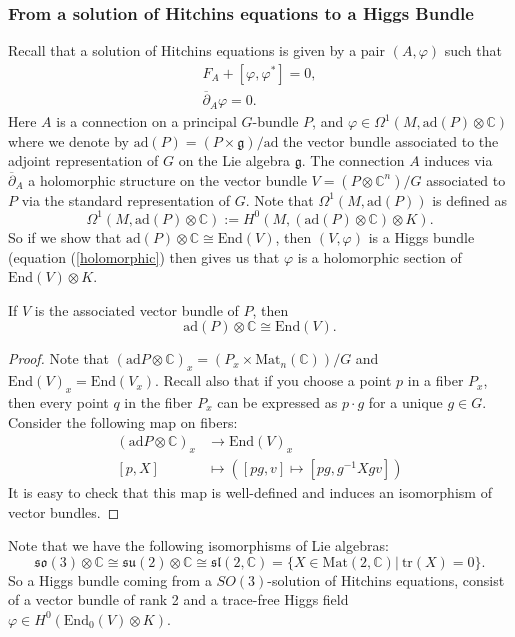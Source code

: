 \subsubsection*{From a solution of Hitchins equations to a Higgs Bundle}
Recall that a solution of Hitchins equations is given by a pair $(A,\varphi)$ such that 
\begin{align}
	F_A + [\varphi,\varphi^*] = 0, \\
	\overline{\partial}_A\varphi = 0. \label{holomorphic}
\end{align}
Here $A$ is a connection on a principal $G$-bundle $P$, and $\varphi \in \Omega^1 ( M , \mathrm{ad} ( P) \otimes \mathbb{C} )$ where we denote by $\mathrm{ad} ( P) = (P \times \mathfrak{g})/\mathrm{ad}$ the vector bundle associated to the adjoint representation of $G$ on the Lie algebra $\mathfrak{g}$. The connection $A$ induces via $\overline{\partial}_A$ a holomorphic structure on the vector bundle $V = (P \otimes \mathbb{C} ^n) / G$ associated to $P$ via the standard representation of $G$. Note that $\Omega^1 ( M , \mathrm{ad} ( P))$ is defined as 
\[
\Omega^1 ( M , \mathrm{ad} ( P)\otimes \mathbb{C}) := H^0 ( M , ( \mathrm{ad} (P) \otimes \mathbb{C} ) \otimes K). 
\]
So if we show that $\mathrm{ad} ( P) \otimes \mathbb{C} \cong \mathrm{End}(V)$, then $(V,\varphi)$ is a Higgs bundle (equation (\ref{holomorphic}) then gives us that $\varphi$ is a holomorphic section of $\mathrm{End}(V)\otimes K$.

\begin{lemma}
	If $V$ is the associated vector bundle of $P$, then
	\[
	\mathrm{ad} ( P) \otimes \mathbb{C} \cong \mathrm{End}(V).
	\]
\end{lemma}
\begin{proof} Note that $(\mathrm{ad}P \otimes \mathbb{C} )_x = (P_x \times \mathrm{Mat}_n(\mathbb{C}))/G$ and $\mathrm{End}(V)_x = \mathrm{End}(V_x)$. Recall also that if you choose a point $p$ in a fiber $P_x$, then every point $q$ in the fiber $P_x$ can be expressed as $p\cdot g$ for a unique $g \in G$. Consider the following map on fibers: 
	\begin{align*}
	(\mathrm{ad}P \otimes \mathbb{C} )_x & \rightarrow  \mathrm{End}(V) _x \\
	[p, X ] & \mapsto ([pg, v] \mapsto [pg, g^{-1} X g v] ) 
	\end{align*}
It is easy to check that this map is well-defined and induces an isomorphism of vector bundles. 
\end{proof}

\begin{remark}\label{G=SU(2)}
	Note that we have the following isomorphisms of Lie algebras:
	\begin{equation}
	\mathfrak{so}(3) \otimes \mathbb{C} \cong \mathfrak{su}(2) \otimes \mathbb{C}  \cong \mathfrak{sl}(2, \mathbb{C} ) = \{ X \in \mathrm{Mat}(2, \mathbb{C} )| ~ \mathrm{tr}(X) = 0 \}.
	\end{equation}
	So a Higgs bundle coming from a $SO(3)$-solution of Hitchins equations, consist of a vector bundle of rank 2 and a trace-free Higgs field $\varphi \in H^0(\mathrm{End}_0(V)\otimes K)$.
\end{remark}

